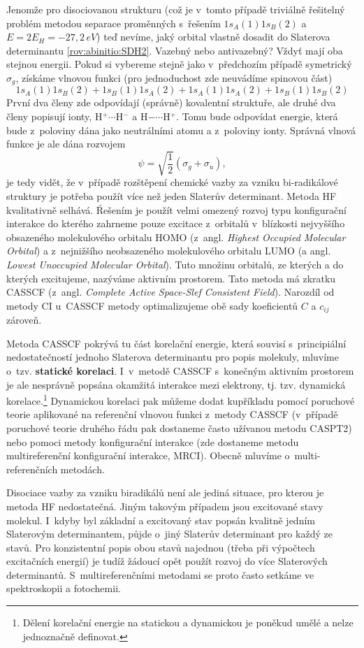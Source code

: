 Jenomže pro disociovanou strukturu (což je v~tomto  případě triviálně řešitelný problém metodou separace proměnných s~řešením $1s_A(1)1s_B(2)$ a $E=2E_H=-27,2\,eV$) teď nevíme, jaký orbital vlastně dosadit do Slaterova determinantu \ref{rov:abinitio:SDH2}. Vazebný nebo antivazebný? Vždyť mají oba stejnou energii. Pokud si vybereme stejně jako v~předchozím případě symetrický $\sigma_g$, získáme vlnovou funkci (pro jednoduchost zde neuvádíme spinovou část)
\begin{equation}
1s_A(1)1s_B(2)+1s_B(1)1s_A(2)+1s_A(1)1s_A(2)+ 1s_B(1)1s_B(2)
\end{equation}
První dva členy zde odpovídají (správně) kovalentní struktuře, ale druhé dva členy popisují ionty, H$^+\cdots$H$^-$ a H$-\cdots$H$^+$. Tomu bude odpovídat energie, která bude z~poloviny dána jako neutrálními atomu a z~poloviny ionty. Správná vlnová funkce je ale dána rozvojem
\begin{equation}
\psi= \sqrt{\frac{1}{2}} (\sigma_g+\sigma_u), 
\end{equation}
je tedy vidět, že v~případě rozštěpení chemické vazby za vzniku bi-radikálové struktury je potřeba použít více než jeden Slaterův determinant. Metoda HF kvalitativně selhává. Ŕešením je použít velmi omezený rozvoj typu konfigurační interakce do kterého zahrneme pouze excitace z~orbitalů v~blízkosti nejvyššího obsazeného molekulového orbitalu HOMO (z~angl. \textit{Highest Occupied Molecular Orbital}) a z~nejnižšího neobsazeného molekulového orbitalu LUMO (a angl. \textit{Lowest Unoccupied Molecular Orbital}). Tuto množinu orbitalů, ze kterých a do kterých excitujeme, nazýváme aktivním prostorem. Tato metoda má zkratku CASSCF (z~angl. \textit{Complete Active Space-Slef Consistent Field}). Narozdíl od metody CI u~CASSCF metody optimalizujeme obě sady koeficientů $C$ a $c_{ij}$ zároveň. 

Metoda CASSCF pokrývá tu část korelační energie, která souvisí s~principiální nedostatečností jednoho Slaterova determinantu pro popis molekuly, mluvíme o~tzv. \textbf{statické korelaci}. I~v~metodě CASSCF s~konečným aktivním prostorem je ale nesprávně popsána okamžitá interakce mezi elektrony, tj. tzv. dynamická korelace.\footnote{Dělení korelační energie na statickou a dynamickou je poněkud umělé a nelze jednoznačně definovat.} Dynamickou korelaci pak můžeme dodat kupříkladu pomocí poruchové teorie aplikované na referenční vlnovou funkci z~metody CASSCF (v~případě poruchové teorie druhého řádu pak dostaneme často užívanou metodu CASPT2) nebo pomoci metody konfigurační interakce (zde dostaneme metodu multireferenční konfigurační interakce, MRCI). Obecně mluvíme o~multi-referenčních metodách.

Disociace vazby za vzniku biradikálů není ale jediná situace, pro kterou je metoda HF nedostatečná. Jiným takovým případem jsou excitované stavy molekul. I~kdyby byl základní a excitovaný stav popsán kvalitně jedním Slaterovým determinantem, půjde o~jiný Slaterův determinant pro každý ze stavů. Pro konzistentní popis obou stavů najednou (třeba při výpočtech excitačních energií) je tudíž žádoucí opět použít rozvoj do více Slaterových determinantů. S~multireferenčními metodami se proto často setkáme ve spektroskopii a fotochemii. 